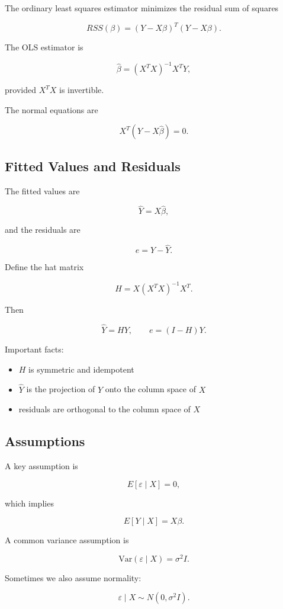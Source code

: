 \documentclass[a4paper,10pt]{article}
\begin{document}
The ordinary least squares estimator minimizes the residual sum of squares

\[
RSS(\beta) = (Y-X\beta)^T(Y-X\beta).
\]

The OLS estimator is

\[
\hat\beta = (X^T X)^{-1}X^T Y,
\]

provided $X^TX$ is invertible.

The normal equations are

\[
X^T(Y-X\hat\beta)=0.
\]

\subsection{Fitted Values and Residuals}

The fitted values are

\[
\hat Y = X\hat\beta,
\]

and the residuals are

\[
e = Y-\hat Y.
\]

Define the hat matrix

\[
H = X(X^TX)^{-1}X^T.
\]

Then

\[
\hat Y = HY, \qquad e = (I-H)Y.
\]

Important facts:

\begin{itemize}
\item $H$ is symmetric and idempotent
\item $\hat Y$ is the projection of $Y$ onto the column space of $X$
\item residuals are orthogonal to the column space of $X$
\end{itemize}

\subsection{Assumptions}

A key assumption is

\[
E[\varepsilon \mid X] = 0,
\]

which implies

\[
E[Y\mid X] = X\beta.
\]

A common variance assumption is

\[
\mathrm{Var}(\varepsilon \mid X)=\sigma^2 I.
\]

Sometimes we also assume normality:

\[
\varepsilon \mid X \sim N(0,\sigma^2 I).
\]
\end{document}

